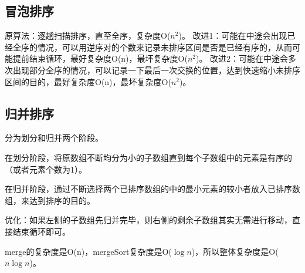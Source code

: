 \documentclass{article}
\begin{document}
\subsection{冒泡排序}

原算法：逐趟扫描排序，直至全序，复杂度O($n^2$)。
改进1：可能在中途会出现已经全序的情况，可以用逆序对的个数来记录未排序区间是否是已经有序的，从而可能提前结束循环，最好复杂度O(n)，最坏复杂度O($n^2$)。
改进2：可能在中途会多次出现部分全序的情况，可以记录一下最后一次交换的位置，达到快速缩小未排序区间的目的，最好复杂度O(n)，最坏复杂度O($n^2$)。

\subsection{归并排序}

分为划分和归并两个阶段。

在划分阶段，将原数组不断均分为小的子数组直到每个子数组中的元素是有序的（或者元素个数为1）。

在归并阶段，通过不断选择两个已排序数组的中的最小元素的较小者放入已排序数组，来达到排序的目的。

优化：如果左侧的子数组先归并完毕，则右侧的剩余子数组其实无需进行移动，直接结束循环即可。

merge的复杂度是O(n)，mergeSort复杂度是O($\log n$)，所以整体复杂度是O($n\log n$)。
\end{document}
